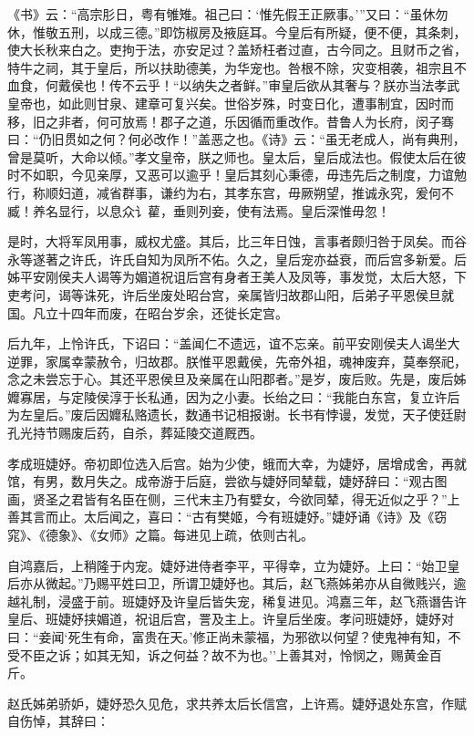 \documentclass[]{article}
\begin{document}
《书》云：``高宗肜日，粤有雊雉。祖己曰：`惟先假王正厥事。'''又曰：``虽休勿休，惟敬五刑，以成三德。''即饬椒房及掖庭耳。今皇后有所疑，便不便，其条刺，使大长秋来白之。吏拘于法，亦安足过？盖矫枉者过直，古今同之。且财币之省，特牛之祠，其于皇后，所以扶助德美，为华宠也。咎根不除，灾变相袭，祖宗且不血食，何戴侯也！传不云乎！``以纳失之者鲜。''审皇后欲从其奢与？朕亦当法孝武皇帝也，如此则甘泉、建章可复兴矣。世俗岁殊，时变日化，遭事制宜，因时而移，旧之非者，何可放焉！郡子之道，乐因循而重改作。昔鲁人为长府，闵子骞曰：``仍旧贯如之何？何必改作！''盖恶之也。《诗》云：``虽无老成人，尚有典刑，曾是莫听，大命以倾。''孝文皇帝，朕之师也。皇太后，皇后成法也。假使太后在彼时不如职，今见亲厚，又恶可以逾乎！皇后其刻心秉德，毋违先后之制度，力谊勉行，称顺妇道，减省群事，谦约为右，其孝东宫，毋厥朔望，推诚永究，爰何不臧！养名显行，以息众讠雚，垂则列妾，使有法焉。皇后深惟毋忽！

是时，大将军凤用事，威权尤盛。其后，比三年日蚀，言事者颇归咎于凤矣。而谷永等遂著之许氏，许氏自知为凤所不佑。久之，皇后宠亦益衰，而后宫多新爱。后姊平安刚侯夫人谒等为媚道祝诅后宫有身者王美人及凤等，事发觉，太后大怒，下吏考问，谒等诛死，许后坐废处昭台宫，亲属皆归故郡山阳，后弟子平恩侯旦就国。凡立十四年而废，在昭台岁余，还徙长定宫。

后九年，上怜许氏，下诏曰：``盖闻仁不遗远，谊不忘亲。前平安刚侯夫人谒坐大逆罪，家属幸蒙赦令，归故郡。朕惟平恩戴侯，先帝外祖，魂神废弃，莫奉祭祀，念之未尝忘于心。其还平恩侯旦及亲属在山阳郡者。''是岁，废后败。先是，废后姊孊寡居，与定陵侯淳于长私通，因为之小妻。长绐之曰：``我能白东宫，复立许后为左皇后。''废后因孊私赂遗长，数通书记相报谢。长书有悖谩，发觉，天子使廷尉孔光持节赐废后药，自杀，葬延陵交道厩西。

孝成班婕妤。帝初即位选入后宫。始为少使，蛾而大幸，为婕妤，居增成舍，再就馆，有男，数月失之。成帝游于后庭，尝欲与婕妤同辇载，婕妤辞曰：``观古图画，贤圣之君皆有名臣在侧，三代末主乃有嬖女，今欲同辇，得无近似之乎？''上善其言而止。太后闻之，喜曰：``古有樊姬，今有班婕妤。''婕妤诵《诗》及《窃窕》、《德象》、《女师》之篇。每进见上疏，依则古礼。

自鸿嘉后，上稍隆于内宠。婕妤进侍者李平，平得幸，立为婕妤。上曰：``始卫皇后亦从微起。''乃赐平姓曰卫，所谓卫婕妤也。其后，赵飞燕姊弟亦从自微贱兴，逾越礼制，浸盛于前。班婕妤及许皇后皆失宠，稀复进见。鸿嘉三年，赵飞燕谮告许皇后、班婕妤挟媚道，祝诅后宫，詈及主上。许皇后坐废。孝问班婕妤，婕妤对曰：``妾闻`死生有命，富贵在天。'修正尚未蒙福，为邪欲以何望？使鬼神有知，不受不臣之诉；如其无知，诉之何益？故不为也。''上善其对，怜悯之，赐黄金百斤。

赵氏姊弟骄妒，婕妤恐久见危，求共养太后长信宫，上许焉。婕妤退处东宫，作赋自伤悼，其辞曰：
\end{document}
